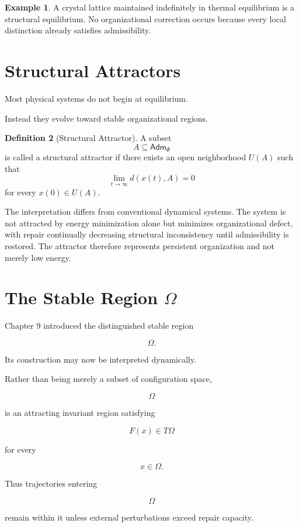 \documentclass[11pt,oneside]{book}
\numberwithin{equation}{chapter}
\theoremstyle{definition}
\newtheorem{definition}{Definition}[chapter]
\newtheorem{example}[definition]{Example}
\theoremstyle{plain}
\newcommand{\Adm}{\mathsf{Adm}}
\begin{document}
\begin{example}
A crystal lattice maintained indefinitely in thermal equilibrium is a
structural equilibrium. No organizational correction occurs because every
local distinction already satisfies admissibility.
\end{example}

\section{Structural Attractors}

Most physical systems do not begin at equilibrium.

Instead they evolve toward stable organizational regions.

\begin{definition}[Structural Attractor]
A subset
\[
A
\subseteq
\Adm_\Phi
\]
is called a structural attractor if there exists an open neighborhood
\(U(A)\) such that
\[
\lim_{t\rightarrow\infty}
d(x(t),A)
=
0
\]
for every \(x(0)\in U(A)\).
\end{definition}

The interpretation differs from conventional dynamical systems. The system is not attracted by energy minimization alone but minimizes organizational defect, with repair continually decreasing structural inconsistency until admissibility is restored. The attractor therefore represents persistent organization and not merely low energy.

\section{The Stable Region \texorpdfstring{$\Omega$}{Omega}}

Chapter 9 introduced the distinguished stable region

\[
\Omega.
\]

Its construction may now be interpreted dynamically.

Rather than being merely a subset of configuration space,

\[
\Omega
\]

is an attracting invariant region satisfying

\[
F(x)
\in
T\Omega
\]

for every

\[
x
\in
\Omega.
\]

Thus trajectories entering

\[
\Omega
\]

remain within it unless external perturbations exceed repair capacity.
\end{document}
